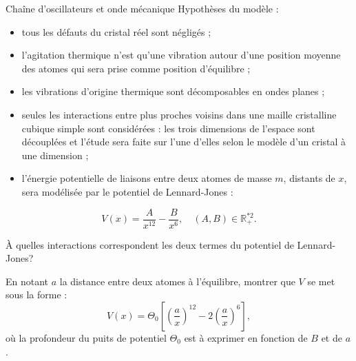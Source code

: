 \begin{exo}[PC][1][devoir]{Chaîne d'oscillateurs et onde mécanique}
Hypothèses du modèle :

\begin{itemize}
  \item tous les défauts du cristal réel sont négligés ;
  \item l'agitation thermique n'est qu'une vibration autour d'une position moyenne des atomes qui sera prise comme position d'équilibre ;
  \item les vibrations d'origine thermique sont décomposables en ondes planes ;
  \item seules les interactions entre plus proches voisins dans une maille cristalline cubique simple sont considérées : les trois dimensions de l'espace sont découplées et l'étude sera faite sur l'une d'elles selon le modèle d'un cristal à une dimension ;
  \item l'énergie potentielle de liaisons entre deux atomes de masse $m$, distants de $x$, sera modélisée par le potentiel de Lennard-Jones :
\end{itemize}

$$
V(x)=\frac{A}{x^{12}}-\frac{B}{x^{6}}, \quad(A, B) \in \mathbb{R}_{+}^{* 2}.
$$
\begin{quest}
  \item À quelles interactions correspondent les deux termes du potentiel de Lennard-Jones?
  
  \item En notant $a$ la distance entre deux atomes à l'équilibre, montrer que $V$ se met sous la forme : 
  $$V(x)=\Theta_{0}\left[\left(\frac{a}{x}\right)^{12}-2\left(\frac{a}{x}\right)^{6}\right],$$ où la profondeur du puits de potentiel $\Theta_{0}$ est à exprimer en fonction de $B$ et de $a$.

\end{quest}
\end{exo}
